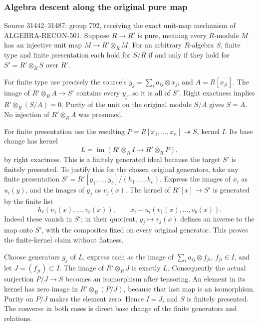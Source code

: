 \subsubsection{Algebra descent along the original pure map}\label{algebra-proof-035-algebra-descent-along-the-original-pure-map}

Source 31442--31487; group 792, receiving the exact unit-map mechanism of ALGEBRA-\AlgebraIdentifierBreak{}RECON-\AlgebraIdentifierBreak{}501. Suppose \(R\to R'\) is pure, meaning every \(R\)-module \(M\) has an injective unit map \(M\to R'\otimes_R M\). For an arbitrary \(R\)-algebra \(S\), finite type and finite presentation each hold for \(S/R\) if and only if they hold for \(S'=R'\otimes_R S\) over \(R'\).

For finite type use precisely the source's \(y_j=\sum_i a_{ij}\otimes x_{ji}\) and \(A=R[x_{ji}]\). The image of \(R'\otimes_R A\to S'\) contains every \(y_j\), so it is all of \(S'\). Right exactness implies \(R'\otimes_R(S/A)=0\). Purity of the unit on the original module \(S/A\) gives \(S=A\). No injection of \(R'\otimes_R A\) was presumed.

For finite presentation use the resulting \(P=R[x_1,\ldots,x_n]\twoheadrightarrow S\), kernel \(I\). Its base change has kernel \[
L=\operatorname{im}(R'\otimes_R I\to R'\otimes_R P),
\] by right exactness. This is a finitely generated ideal because the target \(S'\) is finitely presented. To justify this for the chosen original generators, take any finite presentation \(S'=R'[y_1,\ldots,y_b]/(h_1,\ldots,h_c)\). Express the images of \(x_i\) as \(u_i(y)\), and the images of \(y_j\) as \(v_j(x)\). The kernel of \(R'[x]\to S'\) is generated by the finite list \[
h_\ell(v_1(x),\ldots,v_b(x)),\qquad x_i-u_i(v_1(x),\ldots,v_b(x)).
\] Indeed these vanish in \(S'\); in their quotient, \(y_j\mapsto v_j(x)\) defines an inverse to the map onto \(S'\), with the composites fixed on every original generator. This proves the finite-kernel claim without flatness.

Choose generators \(g_j\) of \(L\), express each as the image of \(\sum_i a_{ij}\otimes f_{ji}\), \(f_{ji}\in I\), and let \(J=(f_{ji})\subset I\). The image of \(R'\otimes_R J\) is exactly \(L\). Consequently the actual surjection \(P/J\to S\) becomes an isomorphism after tensoring. An element in its kernel has zero image in \(R'\otimes_R(P/J)\), because that last map is an isomorphism. Purity on \(P/J\) makes the element zero. Hence \(I=J\), and \(S\) is finitely presented. The converse in both cases is direct base change of the finite generators and relations.

